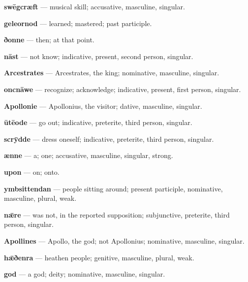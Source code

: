 \textbf{swēgcræft} — musical skill; accusative, masculine, singular.

\textbf{geleornod} — learned; mastered; past participle.

\textbf{ðonne} — then; at that point.

\textbf{nāst} — not know; indicative, present, second person, singular.

\textbf{Arcestrates} — Arcestrates, the king; nominative, masculine, singular.

\textbf{oncnāwe} — recognize; acknowledge; indicative, present, first person, singular.

\textbf{Apollonie} — Apollonius, the visitor; dative, masculine, singular.

\textbf{ūtēode} — go out; indicative, preterite, third person, singular.

\textbf{scrȳdde} — dress oneself; indicative, preterite, third person, singular.

\textbf{ænne} — a; one; accusative, masculine, singular, strong.

\textbf{upon} — on; onto.

\textbf{ymbsittendan} — people sitting around; present participle, nominative, masculine, plural, weak.

\textbf{nǣre} — was not, in the reported supposition; subjunctive, preterite, third person, singular.

\textbf{Apollines} — Apollo, the god; not Apollonius; nominative, masculine, singular.

\textbf{hǣðenra} — heathen people; genitive, masculine, plural, weak.

\textbf{god} — a god; deity; nominative, masculine, singular.

